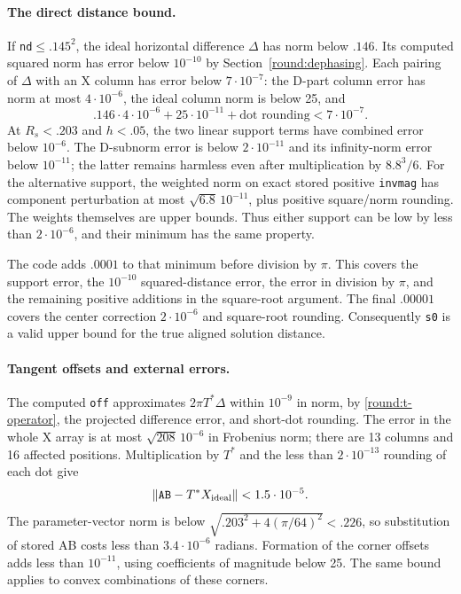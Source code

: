 \paragraph{The direct distance bound.}
If \texttt{nd}$\le.145^2$, the ideal horizontal difference $\Delta$
has norm below $.146$.  Its computed squared norm has error below
$10^{-10}$ by Section~\ref{round:dephasing}.
Each pairing of $\Delta$ with an X column has error below
$7\cdot10^{-7}$: the D-part column error has norm at most
$4\cdot10^{-6}$, the ideal column norm is below 25, and
\[
 .146\cdot4\cdot10^{-6}+25\cdot10^{-11}
      +\text{dot rounding}<7\cdot10^{-7}.
\]
At $R_s<.203$ and $h<.05$, the two linear support terms have combined
error below $10^{-6}$.  The D-subnorm error is below
$2\cdot10^{-11}$ and its infinity-norm error below $10^{-11}$;
the latter remains harmless even after multiplication by
$8.8^3/6$.  For the alternative support, the weighted norm on exact
stored positive \texttt{invmag} has component perturbation at most
$\sqrt{6.8}\,10^{-11}$, plus positive square/norm rounding.  The
weights themselves are upper bounds.
Thus either support can be low by less than $2\cdot10^{-6}$, and
their minimum has the same property.

The code adds $.0001$ to that minimum before division by $\pi$.
This covers the support error, the $10^{-10}$ squared-distance error,
the error in division by $\pi$, and the remaining positive additions
in the square-root argument.  The final $.00001$ covers the center
correction $2\cdot10^{-6}$ and square-root rounding.  Consequently
\texttt{s0} is a valid upper bound for the true aligned solution
distance.

\paragraph{Tangent offsets and external errors.}
The computed \texttt{off} approximates $2\pi T^*\Delta$ within
$10^{-9}$ in norm, by \eqref{round:t-operator}, the projected
difference error, and short-dot rounding.  The error in the whole
X array is at most $\sqrt{208}\,10^{-6}$ in Frobenius norm; there are
13 columns and 16 affected positions.  Multiplication by $T^*$ and
the less than $2\cdot10^{-13}$ rounding of each dot give
\begin{equation}\label{round:ab-error}
 \|\mathtt{AB}-T^*X_{\rm ideal}\|<1.5\cdot10^{-5}.
\end{equation}
The parameter-vector norm is below
$\sqrt{.203^2+4(\pi/64)^2}<.226$, so substitution of stored AB
costs less than $3.4\cdot10^{-6}$ radians.  Formation of the corner
offsets adds less than $10^{-11}$, using coefficients of magnitude
below 25.  The same bound applies to convex combinations of these
corners.

